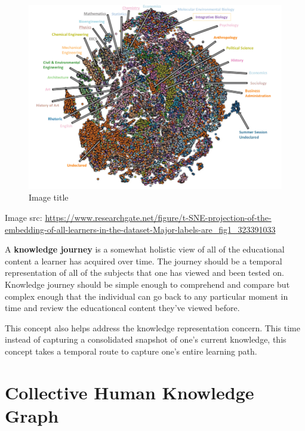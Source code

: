 \documentclass[]{book}
\theoremstyle{definition}
\theoremstyle{definition}
\theoremstyle{definition}
\theoremstyle{remark}
\begin{document}
\begin{figure}
\centering
\includegraphics{img/tsne.png}
\caption{Image title}
\end{figure}

Image src:
\url{https://www.researchgate.net/figure/t-SNE-projection-of-the-embedding-of-all-learners-in-the-dataset-Major-labels-are_fig1_323391033}

A \textbf{knowledge journey} is a somewhat holistic view of all of the
educational content a learner has acquired over time. The journey should
be a temporal representation of all of the subjects that one has viewed
and been tested on. Knowledge journey should be simple enough to
comprehend and compare but complex enough that the individual can go
back to any particular moment in time and review the educationcal
content they've viewed before.

This concept also helps address the knowledge representation concern.
This time instead of capturing a consolidated snapshot of one's current
knowledge, this concept takes a temporal route to capture one's entire
learning path.

\section{Collective Human Knowledge
Graph}\label{collective-human-knowledge-graph}
\end{document}
